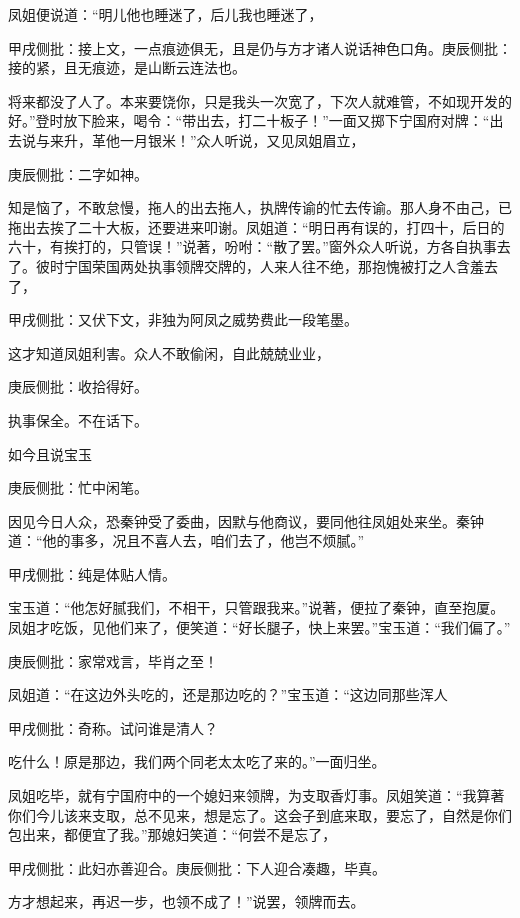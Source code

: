 \begin{parag}


    凤姐便说道：“明儿他也睡迷了，后儿我也睡迷了，\begin{note}甲戌侧批：接上文，一点痕迹俱无，且是仍与方才诸人说话神色口角。庚辰侧批：接的紧，且无痕迹，是山断云连法也。\end{note}将来都没了人了。本来要饶你，只是我头一次宽了，下次人就难管，不如现开发的好。”登时放下脸来，喝令：“带出去，打二十板子！”一面又掷下宁国府对牌：“出去说与来升，革他一月银米！”众人听说，又见凤姐眉立，\begin{note}庚辰侧批：二字如神。\end{note}知是恼了，不敢怠慢，拖人的出去拖人，执牌传谕的忙去传谕。那人身不由己，已拖出去挨了二十大板，还要进来叩谢。凤姐道：“明日再有误的，打四十，后日的六十，有挨打的，只管误！”说著，吩咐：“散了罢。”窗外众人听说，方各自执事去了。彼时宁国荣国两处执事领牌交牌的，人来人往不绝，那抱愧被打之人含羞去了，\begin{note}甲戌侧批：又伏下文，非独为阿凤之威势费此一段笔墨。\end{note}这才知道凤姐利害。众人不敢偷闲，自此兢兢业业，\begin{note}庚辰侧批：收拾得好。\end{note}执事保全。不在话下。
\end{parag}


\begin{parag}


    如今且说宝玉\begin{note}庚辰侧批：忙中闲笔。\end{note}因见今日人众，恐秦钟受了委曲，因默与他商议，要同他往凤姐处来坐。秦钟道：“他的事多，况且不喜人去，咱们去了，他岂不烦腻。”\begin{note}甲戌侧批：纯是体贴人情。\end{note}宝玉道：“他怎好腻我们，不相干，只管跟我来。”说著，便拉了秦钟，直至抱厦。凤姐才吃饭，见他们来了，便笑道：“好长腿子，快上来罢。”宝玉道：“我们偏了。”\begin{note}庚辰侧批：家常戏言，毕肖之至！\end{note}凤姐道：“在这边外头吃的，还是那边吃的？”宝玉道：“这边同那些浑人\begin{note}甲戌侧批：奇称。试问谁是清人？\end{note}吃什么！原是那边，我们两个同老太太吃了来的。”一面归坐。
\end{parag}


\begin{parag}


    凤姐吃毕，就有宁国府中的一个媳妇来领牌，为支取香灯事。凤姐笑道：“我算著你们今儿该来支取，总不见来，想是忘了。这会子到底来取，要忘了，自然是你们包出来，都便宜了我。”那媳妇笑道：“何尝不是忘了，\begin{note}甲戌侧批：此妇亦善迎合。庚辰侧批：下人迎合凑趣，毕真。\end{note}方才想起来，再迟一步，也领不成了！”说罢，领牌而去。
\end{parag}


